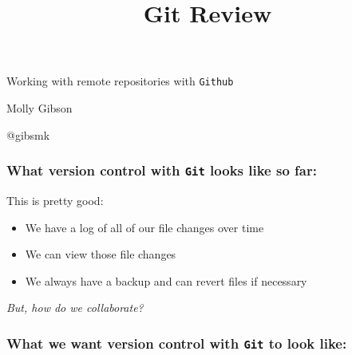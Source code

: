 \documentclass{beamer}
\title{Git Review}
\begin{document}
\begin{frame}
\begin{center}
Working with remote repositories with \texttt{Github}
\vspace{30pt}

Molly Gibson

@gibsmk
\end{center}
\end{frame}

\begin{frame}
\frametitle{What version control with \texttt{Git} looks like so far:}
\begin{center}
\end{center}
This is pretty good:
\begin{itemize}
\item We have a log of all of our file changes  over time
\item We can view those file changes
\item We always have a backup and can revert files if necessary
\end{itemize}
\pause
\begin{center}
\textit{But, how do we collaborate?}
\end{center}
\end{frame}

\begin{frame}
\frametitle{What we want version control with \texttt{Git} to look like:}
\begin{center}
\end{center}
\end{frame}
\end{document}
